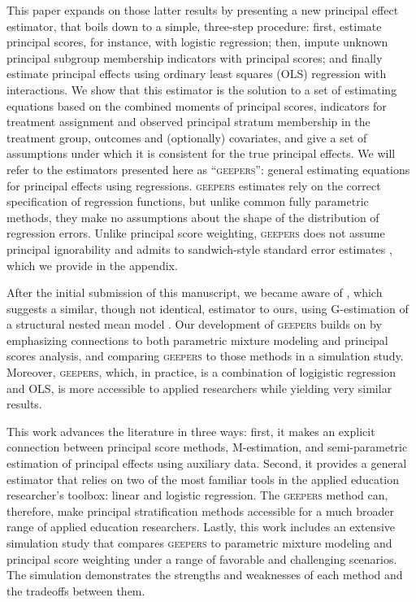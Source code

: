 \documentclass[]{article}
\begin{document}
This paper expands on those latter results by presenting a new principal effect estimator, that boils down to a simple, three-step procedure: first, estimate principal scores, for instance, with logistic regression; then, impute unknown principal subgroup membership indicators with principal scores; and finally estimate principal effects using ordinary least squares (OLS) regression with interactions. %
We show that this estimator is the solution to a set of estimating equations based on the combined moments of principal scores, indicators for treatment assignment and observed principal stratum membership in the treatment group, outcomes and (optionally) covariates, and give a set of assumptions under which it is consistent for the true principal effects.
We will refer to the estimators presented here as ``\textsc{geepers}'': general estimating equations for principal effects using regressions.
\textsc{geepers} estimates rely on the correct specification of regression functions, but unlike common fully parametric methods, they make no assumptions about the shape of the distribution of regression errors.
Unlike principal score weighting, \textsc{geepers} does not assume principal ignorability and admits to sandwich-style standard error estimates \citep{stefanskiBoos}, which we provide in the appendix.

After the initial submission of this manuscript, we became aware of \citet{richardson2023estimating}, which suggests a similar, though not identical, estimator to ours, using G-estimation of a structural nested mean model \citep[e.g.][]{wallace2017r}.
Our development of \textsc{geepers} builds on \citet{richardson2023estimating} by emphasizing connections to both parametric mixture modeling and principal scores analysis, and comparing \textsc{geepers} to those methods in a simulation study.
Moreover, \textsc{geepers}, which, in practice, is a combination of logigistic regression and OLS, is more accessible to applied researchers while yielding very similar results.
 
This work advances the literature in three ways: first, it makes an explicit connection between principal score methods, M-estimation, and semi-parametric estimation of principal effects using auxiliary data. Second, it provides a general estimator that relies on two of the most familiar tools in the applied education researcher's toolbox: linear and logistic regression. The \textsc{geepers} method can, therefore, make principal stratification methods accessible for a much broader range of applied education researchers. Lastly, this work includes an extensive simulation study that compares \textsc{geepers} to parametric mixture modeling and principal score weighting under a range of favorable and challenging scenarios. The simulation demonstrates the strengths and weaknesses of each method and the tradeoffs between them.
\end{document}
